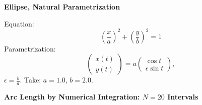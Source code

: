 \documentclass{report}[10pts]
\begin{document}
   \begin{center}
   \textbf{\Large{Ellipse, Natural Parametrization}}
   \end{center}
Equation:
\[
   \left(\frac{x}{a}\right)^2
   +
   \left(\frac{y}{b}\right)^2
   =1
\]
Parametrization:
\[
   \begin{pmatrix}
      x(t)\\y(t)
   \end{pmatrix}=
   a\begin{pmatrix}
      \cos{t}\\ \epsilon \sin{t}
   \end{pmatrix},
\]
$
\epsilon=\frac{b}{a}.
$
Take: $a=1.0$, $b=2.0$.
   \begin{center}
   \textbf{\Large{Arc Length by Numerical Integration: $N=20$ Intervals}}
   \end{center}
\end{document}
